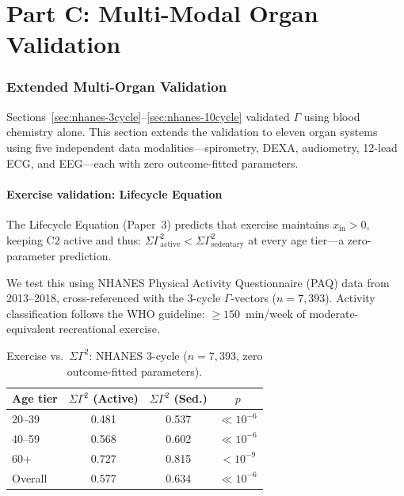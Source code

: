 \documentclass[aps,pre,twocolumn,superscriptaddress,floatfix]{revtex4-2}
\begin{document}
\part*{Part C: Multi-Modal Organ Validation}

\section{Extended Multi-Organ Validation}
\label{sec:extended}

Sections~\ref{sec:nhanes-3cycle}--\ref{sec:nhanes-10cycle}
validated $\Gamma$ using blood chemistry alone.
This section extends the validation to eleven organ systems
using five independent data modalities---spirometry,
DEXA, audiometry, 12-lead ECG, and EEG---each
with zero outcome-fitted parameters.

\subsection{Exercise validation: Lifecycle Equation}
\label{sec:exercise}

The Lifecycle Equation (Paper~3) predicts that exercise maintains
$x_{\text{in}} > 0$, keeping C2 active and thus:
$\Sigma\Gamma^2_{\text{active}} < \Sigma\Gamma^2_{\text{sedentary}}$
at every age tier---a zero-parameter prediction.

We test this using NHANES Physical Activity Questionnaire (PAQ)
data from 2013--2018, cross-referenced with the 3-cycle
$\Gamma$-vectors ($n = 7{,}393$).
Activity classification follows the WHO guideline:
$\geq 150$~min/week of moderate-equivalent recreational exercise.

\begin{table}[h]
\centering
\caption{Exercise vs.\ $\Sigma\Gamma^2$:
  NHANES 3-cycle ($n = 7{,}393$, zero outcome-fitted parameters).}
\label{tab:exercise}
\begin{tabular}{lccc}
\toprule
Age tier & $\Sigma\Gamma^2$ (Active) & $\Sigma\Gamma^2$ (Sed.) & $p$ \\
\midrule
20--39  & 0.481 & 0.537 & $\ll 10^{-6}$ \\
40--59  & 0.568 & 0.602 & $\ll 10^{-6}$ \\
60+     & 0.727 & 0.815 & $<10^{-9}$ \\
\midrule
Overall & 0.577 & 0.634 & $\ll 10^{-6}$ \\
\bottomrule
\end{tabular}
\end{table}
\end{document}
